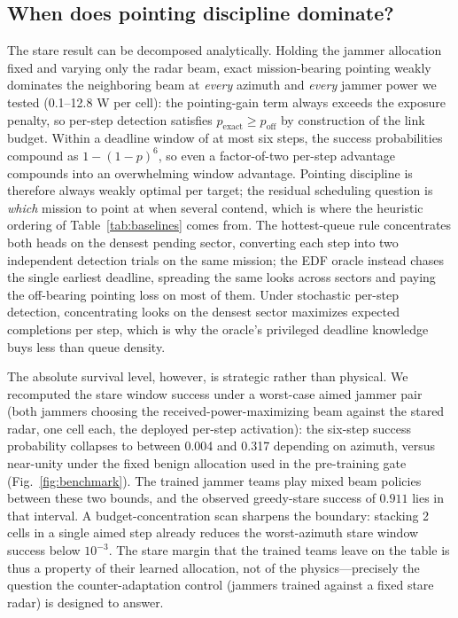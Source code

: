 \subsection{When does pointing discipline dominate?}
The stare result can be decomposed analytically. Holding the jammer allocation fixed and varying only the radar beam, exact mission-bearing pointing weakly dominates the neighboring beam at \emph{every} azimuth and \emph{every} jammer power we tested (0.1--12.8 W per cell): the pointing-gain term always exceeds the exposure penalty, so per-step detection satisfies $p_{\mathrm{exact}}\ge p_{\mathrm{off}}$ by construction of the link budget. Within a deadline window of at most six steps, the success probabilities compound as $1-(1-p)^{6}$, so even a factor-of-two per-step advantage compounds into an overwhelming window advantage. Pointing discipline is therefore always weakly optimal per target; the residual scheduling question is \emph{which} mission to point at when several contend, which is where the heuristic ordering of Table~\ref{tab:baselines} comes from. The hottest-queue rule concentrates both heads on the densest pending sector, converting each step into two independent detection trials on the same mission; the EDF oracle instead chases the single earliest deadline, spreading the same looks across sectors and paying the off-bearing pointing loss on most of them. Under stochastic per-step detection, concentrating looks on the densest sector maximizes expected completions per step, which is why the oracle's privileged deadline knowledge buys less than queue density.

The absolute survival level, however, is strategic rather than physical. We recomputed the stare window success under a worst-case aimed jammer pair (both jammers choosing the received-power-maximizing beam against the stared radar, one cell each, the deployed per-step activation): the six-step success probability collapses to between 0.004 and 0.317 depending on azimuth, versus near-unity under the fixed benign allocation used in the pre-training gate (Fig.~\ref{fig:benchmark}). The trained jammer teams play mixed beam policies between these two bounds, and the observed greedy-stare success of $0.911$ lies in that interval. A budget-concentration scan sharpens the boundary: stacking 2 cells in a single aimed step already reduces the worst-azimuth stare window success below $10^{-3}$. The stare margin that the trained teams leave on the table is thus a property of their learned allocation, not of the physics---precisely the question the counter-adaptation control (jammers trained against a fixed stare radar) is designed to answer.

